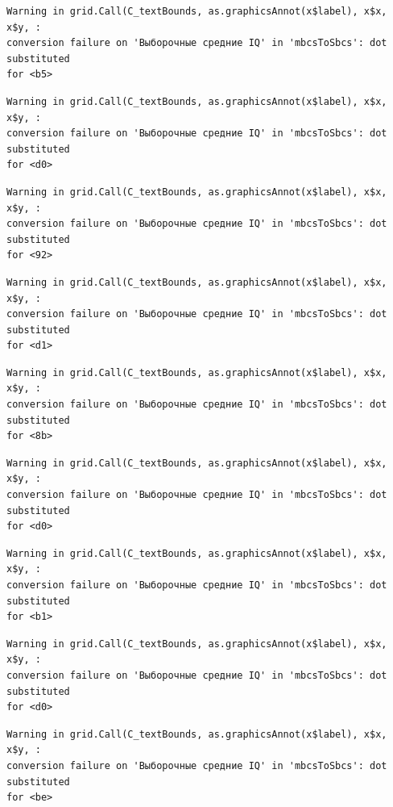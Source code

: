 \documentclass[
  letterpaper,
  DIV=11,
  numbers=noendperiod]{scrreprt}
\theoremstyle{definition}
\theoremstyle{remark}
\begin{document}
\begin{verbatim}
Warning in grid.Call(C_textBounds, as.graphicsAnnot(x$label), x$x, x$y, :
conversion failure on 'Выборочные средние IQ' in 'mbcsToSbcs': dot substituted
for <b5>
\end{verbatim}

\begin{verbatim}
Warning in grid.Call(C_textBounds, as.graphicsAnnot(x$label), x$x, x$y, :
conversion failure on 'Выборочные средние IQ' in 'mbcsToSbcs': dot substituted
for <d0>
\end{verbatim}

\begin{verbatim}
Warning in grid.Call(C_textBounds, as.graphicsAnnot(x$label), x$x, x$y, :
conversion failure on 'Выборочные средние IQ' in 'mbcsToSbcs': dot substituted
for <92>
\end{verbatim}

\begin{verbatim}
Warning in grid.Call(C_textBounds, as.graphicsAnnot(x$label), x$x, x$y, :
conversion failure on 'Выборочные средние IQ' in 'mbcsToSbcs': dot substituted
for <d1>
\end{verbatim}

\begin{verbatim}
Warning in grid.Call(C_textBounds, as.graphicsAnnot(x$label), x$x, x$y, :
conversion failure on 'Выборочные средние IQ' in 'mbcsToSbcs': dot substituted
for <8b>
\end{verbatim}

\begin{verbatim}
Warning in grid.Call(C_textBounds, as.graphicsAnnot(x$label), x$x, x$y, :
conversion failure on 'Выборочные средние IQ' in 'mbcsToSbcs': dot substituted
for <d0>
\end{verbatim}

\begin{verbatim}
Warning in grid.Call(C_textBounds, as.graphicsAnnot(x$label), x$x, x$y, :
conversion failure on 'Выборочные средние IQ' in 'mbcsToSbcs': dot substituted
for <b1>
\end{verbatim}

\begin{verbatim}
Warning in grid.Call(C_textBounds, as.graphicsAnnot(x$label), x$x, x$y, :
conversion failure on 'Выборочные средние IQ' in 'mbcsToSbcs': dot substituted
for <d0>
\end{verbatim}

\begin{verbatim}
Warning in grid.Call(C_textBounds, as.graphicsAnnot(x$label), x$x, x$y, :
conversion failure on 'Выборочные средние IQ' in 'mbcsToSbcs': dot substituted
for <be>
\end{verbatim}
\end{document}
